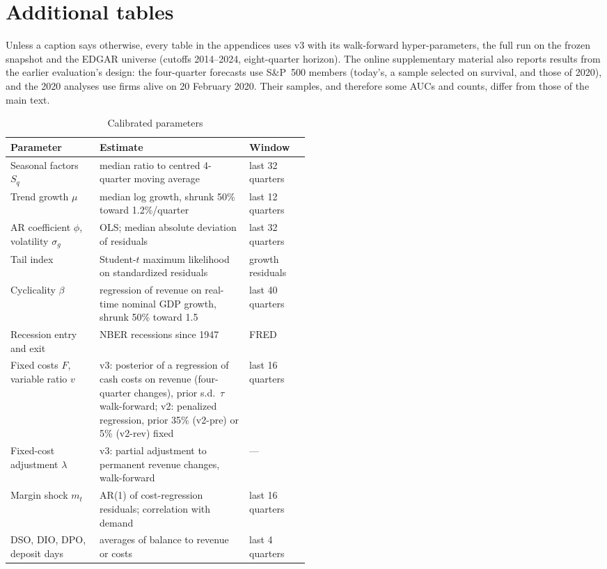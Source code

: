 \section{Additional tables}\label{app:tables}
Unless a caption says otherwise, every table in the appendices uses v3 with its walk-forward hyper-parameters, the full run on the frozen snapshot and the EDGAR universe (cutoffs 2014--2024, eight-quarter horizon). The online supplementary material also reports results from the earlier evaluation's design: the four-quarter forecasts use S\&P~500 members (today's, a sample selected on survival, and those of 2020), and the 2020 analyses use firms alive on 20 February 2020. Their samples, and therefore some AUCs and counts, differ from those of the main text.

\begin{table}[!htbp]
\centering\scriptsize
\caption{Calibrated parameters}
\label{tab:params}
\begin{tabular}{lp{0.5\linewidth}l}
\toprule
Parameter & Estimate & Window \\
\midrule
Seasonal factors $S_q$ & median ratio to centred 4-quarter moving average & last 32 quarters \\
Trend growth $\mu$ & median log growth, shrunk 50\% toward 1.2\%/quarter & last 12 quarters \\
AR coefficient $\phi$, volatility $\sigma_g$ & OLS; median absolute deviation of residuals & last 32 quarters \\
Tail index & Student-$t$ maximum likelihood on standardized residuals & growth residuals \\
Cyclicality $\beta$ & regression of revenue on real-time nominal GDP growth, shrunk 50\% toward 1.5 & last 40 quarters \\
Recession entry and exit & NBER recessions since 1947 & FRED \\
Fixed costs $F$, variable ratio $v$ & v3: posterior of a regression of cash costs on revenue (four-quarter changes), prior s.d.\ $\tau$ walk-forward; v2: penalized regression, prior 35\% (v2-pre) or 5\% (v2-rev) fixed & last 16 quarters \\
Fixed-cost adjustment $\lambda$ & v3: partial adjustment to permanent revenue changes, walk-forward & --- \\
Margin shock $m_t$ & AR(1) of cost-regression residuals; correlation with demand & last 16 quarters \\
DSO, DIO, DPO, deposit days & averages of balance to revenue or costs & last 4 quarters \\

\end{tabular}
\end{table}
